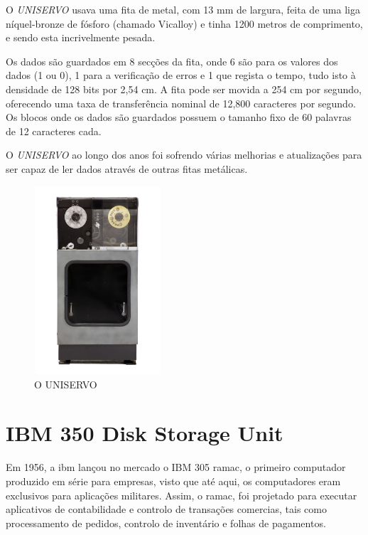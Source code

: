 \documentclass{report}
\begin{document}
	O \textit{UNISERVO}  usava uma fita de metal, com 13 mm de largura, feita de uma liga níquel-bronze de fósforo (chamado Vicalloy) e tinha 1200 metros de comprimento, e sendo esta incrivelmente pesada.
\vspace{1mm}
	
	Os dados são guardados em 8 secções da fita, onde 6 são para os valores dos dados (1 ou 0), 1 para a verificação de erros e 1 que regista o tempo, tudo isto à densidade de 128 bits por 2,54 cm. A fita pode ser movida a 254 cm por segundo, oferecendo uma taxa de transferência nominal de 12,800 caracteres por segundo. Os blocos onde os dados são guardados possuem o tamanho fixo de 60 palavras de 12 caracteres cada.
\vspace{1mm}
	
	O \textit{UNISERVO}  ao longo dos anos foi sofrendo várias melhorias e atualizações para ser capaz de ler dados através de outras fitas metálicas.

\begin{figure}[h]
		\centering
		\includegraphics[width=4.7cm, height=7cm]{uniservo.jpg}
		\caption{O UNISERVO}
		\end{figure}
	
\newpage
		\section{IBM 350 Disk Storage Unit}
		
		Em 1956, a \ac{ibm} lançou no mercado o IBM 305 \ac{ramac}, o primeiro computador produzido em série para empresas, visto que até aqui, os computadores eram exclusivos para aplicações militares. Assim, o \ac{ramac}, foi projetado para executar aplicativos de contabilidade e controlo de transações comercias, tais como processamento de pedidos, controlo de inventário e folhas de pagamentos.
\vspace{1mm}
\end{document}
